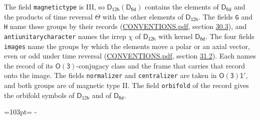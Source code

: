 \documentclass[10pt,a4paper]{article}
\newcommand{\needspace}[1]{\par\penalty-100\begingroup\dimen0=#1\relax\dimen2=\pagegoal
  \advance\dimen2-\pagetotal\ifdim\dimen0>\dimen2\relax\ifdim\dimen2>0pt\vfil\break\fi\fi
  \endgroup}
\numberwithin{equation}{section}
\newcommand{\grp}[1]{\mathsf{#1}}
\begin{document}
The field \texttt{magnetictype} is III, so $\grp{D_{12h}}(\grp{D_{6d}})$ contains the elements of $\grp{D_{6d}}$ and the products of time reversal $\varTheta$ with the other elements of $\grp{D_{12h}}$. The fields \texttt{G} and \texttt{H} name these groups by their records (\href{../../CONVENTIONS.pdf}{CONVENTIONS.pdf}, section \href{../../CONVENTIONS.pdf\#conv.30.3}{30.3}), and \texttt{antiunitarycharacter} names the irrep $\chi$ of $\grp{D_{12h}}$ with kernel $\grp{D_{6d}}$. The four fields \texttt{images} name the groups by which the elements move a polar or an axial vector, even or odd under time reversal (\href{../../CONVENTIONS.pdf}{CONVENTIONS.pdf}, section \href{../../CONVENTIONS.pdf\#conv.31.2}{31.2}). Each names the record of its $\grp{O(3)}$-conjugacy class and the frame that carries that record onto the image. The fields \texttt{normalizer} and \texttt{centralizer} are taken in $\grp{O(3)1'}$, and both groups are of magnetic type II. The field \texttt{orbifold} of the record gives the orbifold symbols of $\grp{D_{12h}}$ and of $\grp{D_{6d}}$.
\needspace{103pt}
\end{document}
